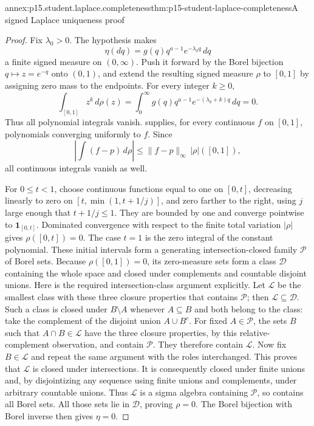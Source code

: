 \begin{annexitem}{annex:p15.student.laplace.completeness}{thm:p15-student-laplace-completeness}{A signed Laplace uniqueness proof}
\begin{proof}
Fix \(\lambda_0>0\). The hypothesis makes
\[
        \eta(dq)=g(q)q^{a-1}e^{-\lambda_0q}\,dq
\]
a finite signed measure on \((0,\infty)\).
Push it forward by the Borel bijection
\(q\mapsto z=e^{-q}\) onto \((0,1)\), and extend
the resulting signed measure \(\rho\) to \([0,1]\)
by assigning zero mass to the endpoints.
For every integer \(k\geq0\),
\[
       \int_{[0,1]} z^k\,d\rho(z)
       =\int_0^\infty g(q)q^{a-1}
                    e^{-(\lambda_0+k)q}\,dq=0.
\]
Thus all polynomial integrals vanish.
 supplies, for every
continuous \(f\) on \([0,1]\), polynomials converging
uniformly to \(f\). Since
\[
 \left|\int(f-p)\,d\rho\right|
      \leq\|f-p\|_\infty\,|\rho|([0,1]),
\]
all continuous integrals vanish as well.

For \(0\leq t<1\), choose continuous functions equal
to one on \([0,t]\), decreasing linearly to zero on
\([t,\min(1,t+1/j)]\), and zero farther to the right,
using \(j\) large enough that \(t+1/j\leq1\).
They are bounded by one and converge pointwise to
\(\mathbf1_{[0,t]}\). Dominated convergence with
respect to the finite total variation \(|\rho|\)
gives \(\rho([0,t])=0\). The case \(t=1\)
is the zero integral of the constant polynomial.
These initial intervals form a generating
intersection-closed family \(\mathcal P\) of Borel sets.
Because \(\rho([0,1])=0\), its zero-measure sets form
a class \(\mathcal D\) containing the whole space and
closed under complements and countable disjoint unions.
Here is the required intersection-class argument explicitly.
Let \(\mathcal L\) be the smallest class with these
three closure properties that contains \(\mathcal P\);
then \(\mathcal L\subseteq\mathcal D\).
Such a class is closed under \(B\setminus A\)
whenever \(A\subseteq B\) and both belong to the class:
take the complement of the disjoint union \(A\cup B^c\).
For fixed \(A\in\mathcal P\), the sets \(B\) such that
\(A\cap B\in\mathcal L\) have the three closure properties,
by this relative-complement observation, and contain
\(\mathcal P\). They therefore contain \(\mathcal L\).
Now fix \(B\in\mathcal L\) and repeat the same argument
with the roles interchanged. This proves that
\(\mathcal L\) is closed under intersections.
It is consequently closed under finite unions and,
by disjointizing any sequence using finite unions
and complements, under arbitrary countable unions.
Thus \(\mathcal L\) is a sigma algebra containing
\(\mathcal P\), so contains all Borel sets.
All those sets lie in \(\mathcal D\), proving \(\rho=0\).
The Borel bijection with Borel inverse then gives
\(\eta=0\).


\end{proof}
\end{annexitem}
